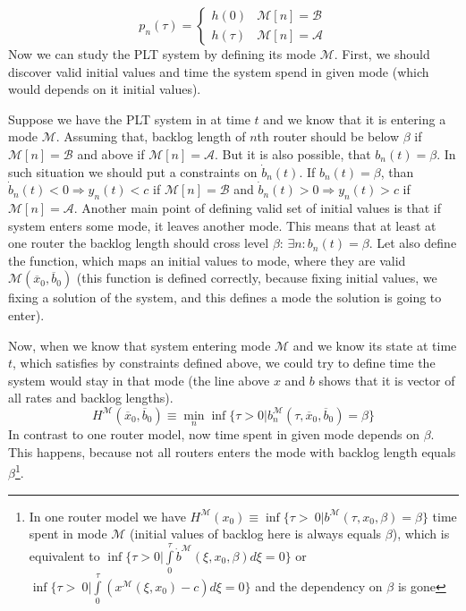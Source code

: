 \begin{equation}
    p_n(\tau) = 
    \begin{cases}
        h(0) & \mathcal{M}[n]=\mathcal{B} \\
        h(\tau) & \mathcal{M}[n]=\mathcal{A}
    \end{cases}
\end{equation}
Now we can study the PLT system by defining its mode $\mathcal{M}$. First, we should discover valid initial values and time the system spend in given mode (which would depends on it initial values).

Suppose we have the PLT system in at time $t$ and we know that it is entering a mode $\mathcal{M}$. Assuming that, backlog length of $n$th router should be below $\beta$ if $\mathcal{M}[n]=\mathcal{B}$ and above if $\mathcal{M}[n]=\mathcal{A}$. But it is also possible, that $b_n(t) = \beta$. In such situation we should put a constraints on $\dot{b}_n(t)$. If $b_n(t) = \beta$, than $\dot{b}_n(t) < 0 \Rightarrow y_n(t) < c$ if $\mathcal{M}[n]=\mathcal{B}$ and $\dot{b}_n(t) > 0 \Rightarrow y_n(t) > c$ if $\mathcal{M}[n]=\mathcal{A}$. Another main point of defining valid set of initial values is that if system enters some mode, it leaves another mode. This means that at least at one router the backlog length should cross level $\beta$: $\exists n : b_n(t)=\beta$. Let also define the function, which maps an initial values to mode, where they are valid $\mathcal{M}(\overline{x}_0, \overline{b}_0)$ (this function is defined correctly, because fixing initial values, we fixing a solution of the system, and this defines a mode the solution is going to enter).

Now, when we know that system entering mode $\mathcal{M}$ and we know its state at time $t$, which satisfies by constraints defined above, we could try to define time the system would stay in that mode (the line above $x$ and $b$ shows that it is vector of all rates and backlog lengths).
\begin{equation}
    H^\mathcal{M}(\overline{x}_0, \overline{b}_0) \equiv \min \limits_n \inf \{ \tau > 0 | b^\mathcal{M}_n(\tau, \overline{x}_0, \overline{b}_0) = \beta \}
\end{equation}
In contrast to one router model, now time spent in given mode depends on $\beta$. This happens, because not all routers enters the mode with backlog length equals $\beta$\footnote{In one router model we have $H^\mathcal{M}(x_0) \equiv \inf \{ \tau >~0 | b^\mathcal{M}(\tau, x_0, \beta) = \beta \}$ time spent in mode $\mathcal{M}$ (initial values of backlog here is always equals $\beta$), which is equivalent to $\inf \{ \tau > 0 | \int \limits_0^\tau \dot{b}^\mathcal{M}(\xi, x_0, \beta) d\xi = 0 \}$ or $\inf \{ \tau >~0 | \int \limits_0^\tau \left( x^\mathcal{M}(\xi, x_0) - c \right) d\xi = 0 \}$ and the dependency on $\beta$ is gone}. 

